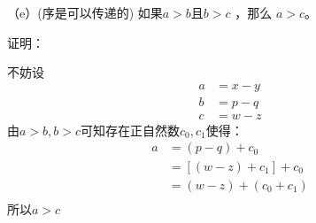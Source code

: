 \documentclass{article}
\theoremstyle{mystyle}
\theoremstyle{zproofstyle}
\begin{document}
（e）(序是可以传递的) 如果$a > b$且$b > c$ ，那么 $a > c$。

证明：

不妨设
\begin{align}
  a & = x - y \\
  b & = p - q \\
  c & = w - z 
\end{align}
由$a>b,b>c$可知存在正自然数$c_0,c_1$使得：
\begin{align*}
  a & = (p - q) + c_0         \\
    & = [(w - z) + c_1] + c_0 \\
    & = (w - z) + (c_0 + c_1) \\
\end{align*}
所以$a > c$
\end{document}
